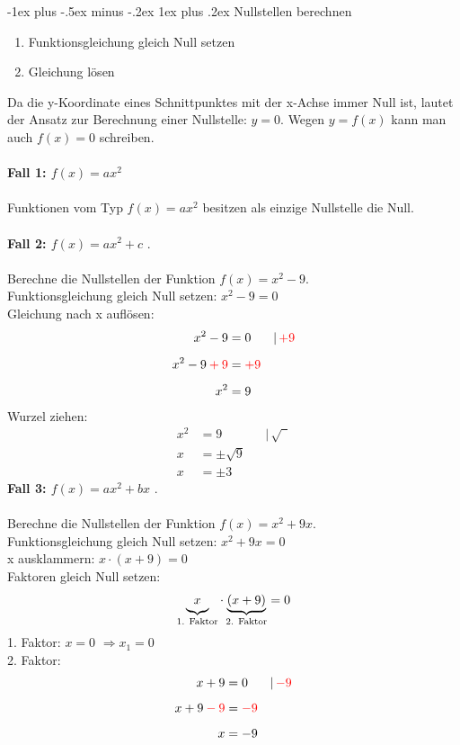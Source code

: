 \documentclass[a4paper,10pt]{article}
\makeatletter
\renewcommand{\subsubsection}{\@startsection{subsubsection}{3}{0mm}%
                                {-1ex plus -.5ex minus -.2ex}%
                                {1ex plus .2ex}%
                                {\normalfont\small\bfseries}}
\makeatother
\begin{document}
\begin{multicols}{3}
    \subsubsection{Nullstellen berechnen}
    \begin{enumerate}
        \item Funktionsgleichung gleich Null setzen
        \item Gleichung lösen
    \end{enumerate}
    Da die y-Koordinate eines Schnittpunktes mit der x-Achse immer Null ist, lautet der Ansatz zur Berechnung einer Nullstelle: $y = 0$. Wegen $y = f(x)$ kann man auch $f(x) = 0$ schreiben. \\~\\
    \textbf{Fall 1: $f(x) = ax^2$} \\~\\
    Funktionen vom Typ $f(x) = ax^2$ besitzen als einzige Nullstelle die Null. \\~\\
    \textbf{Fall 2: $f(x) = ax^2 + c$} . \\~\\
    Berechne die Nullstellen der Funktion $f(x) = x^2 - 9$.\\
    Funktionsgleichung gleich Null setzen: $x^2 - 9 = 0$\\
    Gleichung nach x auflösen:
    \begin{align*} x^2 - 9 &= 0 &&|\, {\color{red}+9} \\[5px] x^2 - 9 {\color{red}\:+\:9} &= {\color{red}+9} \\[5px] x^2 &= 9 \end{align*}
    Wurzel ziehen:
    \begin{align*} x^2 &= 9 &&|\, \sqrt{\phantom{9}} \\[5px] x &= \pm \sqrt{9} \\[5px] x &= \pm 3 \end{align*}
    \textbf{Fall 3: $f(x) = ax^2 + bx$} . \\~\\
    Berechne die Nullstellen der Funktion $f(x) = x^2 + 9x$. \\
    Funktionsgleichung gleich Null setzen: $x^2 + 9x = 0$ \\
    x ausklammern: $x \cdot (x + 9) = 0$ \\
    Faktoren gleich Null setzen:
    \[\underbrace{x\vphantom{()}}_{\text{1. Faktor}} \cdot \underbrace{(x+9)}_{\text{2. Faktor}} = 0\]
    1. Faktor: $x = 0$ $\Rightarrow x_1 = 0$ \\
    2. Faktor:
    \begin{align*} x + 9 &= 0 &&|\, {\color{red}-9} \\[5px] x + 9 {\color{red}\:-\:9} &= {\color{red}-9} \\[5px] x &= -9 \end{align*}

\end{multicols}
\end{document}
